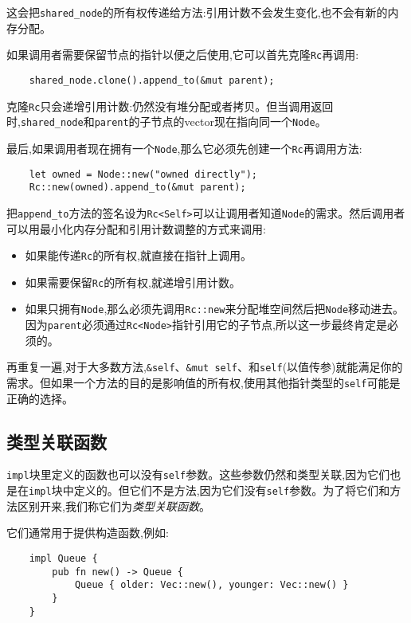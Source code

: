 这会把\texttt{shared\_node}的所有权传递给方法:引用计数不会发生变化,也不会有新的内存分配。

如果调用者需要保留节点的指针以便之后使用,它可以首先克隆\texttt{Rc}再调用:
\begin{verbatim}
    shared_node.clone().append_to(&mut parent);
\end{verbatim}

克隆\texttt{Rc}只会递增引用计数:仍然没有堆分配或者拷贝。但当调用返回时,\texttt{shared\_node}和\texttt{parent}的子节点的vector现在指向同一个\texttt{Node}。

最后,如果调用者现在拥有一个\texttt{Node},那么它必须先创建一个\texttt{Rc}再调用方法:
\begin{verbatim}
    let owned = Node::new("owned directly");
    Rc::new(owned).append_to(&mut parent);
\end{verbatim}

把\texttt{append\_to}方法的签名设为\texttt{Rc<Self>}可以让调用者知道\texttt{Node}的需求。然后调用者可以用最小化内存分配和引用计数调整的方式来调用:
\begin{itemize}
    \item 如果能传递\texttt{Rc}的所有权,就直接在指针上调用。
    \item 如果需要保留\texttt{Rc}的所有权,就递增引用计数。
    \item 如果只拥有\texttt{Node},那么必须先调用\texttt{Rc::new}来分配堆空间然后把\texttt{Node}移动进去。因为\texttt{parent}必须通过\texttt{Rc<Node>}指针引用它的子节点,所以这一步最终肯定是必须的。
\end{itemize}

再重复一遍,对于大多数方法,\texttt{\&self}、\texttt{\&mut self}、和\texttt{self}(以值传参)就能满足你的需求。但如果一个方法的目的是影响值的所有权,使用其他指针类型的\texttt{self}可能是正确的选择。

\subsection{类型关联函数}
\texttt{impl}块里定义的函数也可以没有\texttt{self}参数。这些参数仍然和类型关联,因为它们也是在\texttt{impl}块中定义的。但它们不是方法,因为它们没有\texttt{self}参数。为了将它们和方法区别开来,我们称它们为\emph{类型关联函数}。

它们通常用于提供构造函数,例如:
\begin{verbatim}
    impl Queue {
        pub fn new() -> Queue {
            Queue { older: Vec::new(), younger: Vec::new() }
        }
    }
\end{verbatim}

